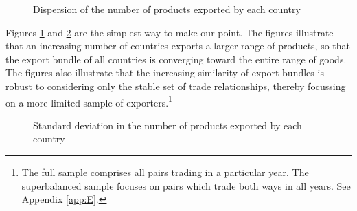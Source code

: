 \documentclass[12pt,twoside,a4paper,notitlepage]{article}
\begin{document}
\begin{figure}[h!]
	\caption{Dispersion of the number of products exported by each country \label{fig:vioplot}}
	\begin{center}
		\setlength{\fboxrule}{1pt} %
		\setlength{\fboxsep}{.1in} %
	\end{center}
\end{figure}


Figures \ref{fig:vioplot} and \ref{fig:fall_of_sd} are the simplest way to make our point. 
The figures illustrate that an increasing number of countries exports a larger range of products, so that the export bundle of all countries is converging toward the entire range of goods.
The figures also illustrate that the increasing similarity of export bundles is robust to considering only the stable set of trade relationships, thereby focussing on a more limited sample of exporters.\footnote{The full sample comprises all pairs trading in a particular year. The superbalanced sample focuses on pairs which trade both ways in all years. See Appendix \ref{app:E}.} 

\begin{figure}[h!]
	\caption{Standard deviation in the number of products exported by each country \label{fig:fall_of_sd}}
	\begin{center}
		\setlength{\fboxrule}{1pt} %
		\setlength{\fboxsep}{.1in} %
	\end{center}
\end{figure}
\end{document}
